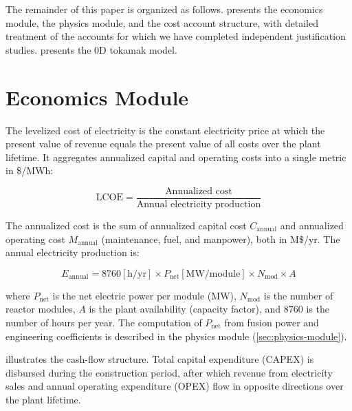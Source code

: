 \documentclass{article}
\begin{document}
The remainder of this paper is organized as follows.
 presents the economics module,
 the physics module, and
 the cost account structure, with detailed treatment of
the accounts for which we have completed independent justification
studies.  presents the 0D tokamak model.


\section{Economics Module}
\label{sec:lcoe}

The levelized cost of electricity is the constant electricity price at
which the present value of revenue equals the present value of all costs
over the plant lifetime. It aggregates annualized capital and operating
costs into a single metric in \$/MWh:

\begin{equation}
\label{eq:lcoe}
\text{LCOE} = \frac{\text{Annualized cost}}{\text{Annual electricity production}}
\end{equation}

\noindent The annualized cost is the sum of annualized capital cost
$C_{\text{annual}}$ and annualized operating cost $M_{\text{annual}}$
(maintenance, fuel, and manpower), both in M\$/yr. The annual electricity
production is:

\begin{equation}
\label{eq:e-annual}
E_{\text{annual}} = 8760[\text{h}/\text{yr}] \times P_{\text{net}} [\text{MW}/\text{module}] \times N_{\text{mod}} \times A
\end{equation}

\noindent where $P_{\text{net}}$ is the net electric power per module (MW),
$N_{\text{mod}}$ is the number of reactor modules, $A$ is the plant
availability (capacity factor), and 8760 is the number of hours per year.
The computation of $P_{\text{net}}$ from fusion power and
engineering coefficients is described in the physics module
(\cref{sec:physics-module}).

 illustrates the cash-flow structure. Total capital
expenditure (CAPEX) is disbursed during the construction period, after
which revenue from electricity sales and annual operating expenditure
(OPEX) flow in opposite directions over the plant lifetime.
\end{document}
